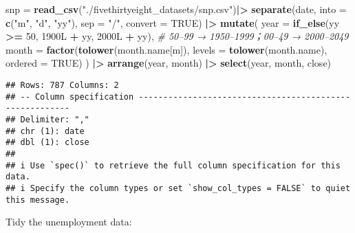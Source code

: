 \documentclass[
]{article}
\newenvironment{Shaded}{\begin{snugshade}}{\end{snugshade}}
\newcommand{\AttributeTok}[1]{\textcolor[rgb]{0.13,0.29,0.53}{#1}}
\newcommand{\CommentTok}[1]{\textcolor[rgb]{0.56,0.35,0.01}{\textit{#1}}}
\newcommand{\ConstantTok}[1]{\textcolor[rgb]{0.56,0.35,0.01}{#1}}
\newcommand{\DataTypeTok}[1]{\textcolor[rgb]{0.13,0.29,0.53}{#1}}
\newcommand{\DecValTok}[1]{\textcolor[rgb]{0.00,0.00,0.81}{#1}}
\newcommand{\FunctionTok}[1]{\textcolor[rgb]{0.13,0.29,0.53}{\textbf{#1}}}
\newcommand{\NormalTok}[1]{#1}
\newcommand{\OtherTok}[1]{\textcolor[rgb]{0.56,0.35,0.01}{#1}}
\newcommand{\SpecialCharTok}[1]{\textcolor[rgb]{0.81,0.36,0.00}{\textbf{#1}}}
\newcommand{\StringTok}[1]{\textcolor[rgb]{0.31,0.60,0.02}{#1}}
\begin{document}
\begin{Shaded}
\begin{Highlighting}[]
\NormalTok{snp }\OtherTok{=}
  \FunctionTok{read\_csv}\NormalTok{(}\StringTok{"./fivethirtyeight\_datasets/snp.csv"}\NormalTok{)}\SpecialCharTok{|\textgreater{}}
  \FunctionTok{separate}\NormalTok{(date, }\AttributeTok{into =} \FunctionTok{c}\NormalTok{(}\StringTok{"m"}\NormalTok{, }\StringTok{"d"}\NormalTok{, }\StringTok{"yy"}\NormalTok{), }\AttributeTok{sep =} \StringTok{"/"}\NormalTok{, }\AttributeTok{convert =} \ConstantTok{TRUE}\NormalTok{) }\SpecialCharTok{|\textgreater{}}
  \FunctionTok{mutate}\NormalTok{(}
    \AttributeTok{year  =} \FunctionTok{if\_else}\NormalTok{(yy }\SpecialCharTok{\textgreater{}=} \DecValTok{50}\NormalTok{, }\DecValTok{1900}\DataTypeTok{L} \SpecialCharTok{+}\NormalTok{ yy, }\DecValTok{2000}\DataTypeTok{L} \SpecialCharTok{+}\NormalTok{ yy),   }\CommentTok{\# 50–99 → 1950–1999；00–49 → 2000–2049}
    \AttributeTok{month =} \FunctionTok{factor}\NormalTok{(}\FunctionTok{tolower}\NormalTok{(month.name[m]),}
                   \AttributeTok{levels =} \FunctionTok{tolower}\NormalTok{(month.name), }\AttributeTok{ordered =} \ConstantTok{TRUE}\NormalTok{)}
\NormalTok{  ) }\SpecialCharTok{|\textgreater{}}
  \FunctionTok{arrange}\NormalTok{(year, month) }\SpecialCharTok{|\textgreater{}}
  \FunctionTok{select}\NormalTok{(year, month, close)}
\end{Highlighting}
\end{Shaded}

\begin{verbatim}
## Rows: 787 Columns: 2
## -- Column specification --------------------------------------------------------
## Delimiter: ","
## chr (1): date
## dbl (1): close
## 
## i Use `spec()` to retrieve the full column specification for this data.
## i Specify the column types or set `show_col_types = FALSE` to quiet this message.
\end{verbatim}

Tidy the unemployment data:
\end{document}
